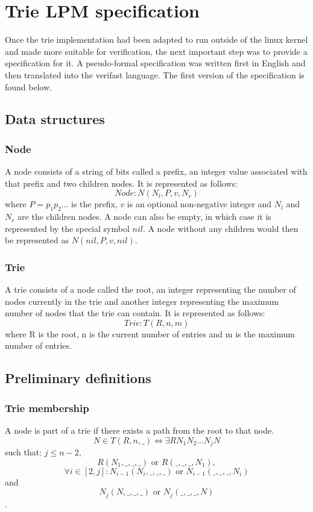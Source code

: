 \documentclass{article}
\begin{document}
\section{Trie LPM specification}
Once the trie implementation had been adapted to run outside of the linux kernel and
made more suitable for verification, the next important step was to provide a specification
for it. A pseudo-formal specification was written first in English and then translated
into the verifast language. The first version of the specification is found below.
\subsection{Data structures}
\subsubsection{Node}
A node consists of a string of bits called a prefix, an integer value
associated with that prefix and two children nodes. It is represented
as follows:
\[
    Node: N(N_l, P, v, N_r)
\]
where $P = p_1p_2...$ is the prefix, $v$ is an optional non-negative integer and
$N_l$ and $N_r$ are the children nodes. A node can also be empty, in which case
it is represented by the special symbol $nil$. A node without any children would
then be represented as $N(nil, P, v, nil)$.
\subsubsection{Trie}
A trie consists of a node called the root, an integer representing the
number of nodes currently in the trie and another integer representing the
maximum number of nodes that the trie can contain. It is represented as follows:
\[
    Trie: T(R, n, m)
\]
where R is the root, n is the current number of entries and m is the maximum
number of entries.
\subsection{Preliminary definitions}
\subsubsection{Trie membership}
A node is part of a trie if there exists a path from the root to that node.
\[
    N \in T(R, n, \_) \Leftrightarrow \exists RN_1N_2...N_jN
\]
such that: $j \leq n-2$,
\[
    R(N_1, \_, \_, \_) \text{ or } R(\_, \_, \_, N_1),
\]
\[
    \forall i \in [2, j]: N_{i-1}(N_i, \_, \_, \_) \text{ or } N_{i-1}(\_, \_, \_, N_i)
\]
and
\[
    N_j(N, \_, \_, \_) \text{ or } N_j(\_, \_, \_, N)
\].
\end{document}
